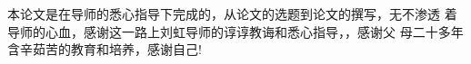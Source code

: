 \newpage
{\kaishu
  \begin{center}
    \LARGE\bfseries{}
  \end{center}

  本论文是在导师的悉心指导下完成的，从论文的选题到论文的撰写，无不渗透
着导师的心血，感谢这一路上刘虹导师的谆谆教诲和悉心指导，，感谢父
母二十多年含辛茹苦的教育和培养，感谢自己!

} 